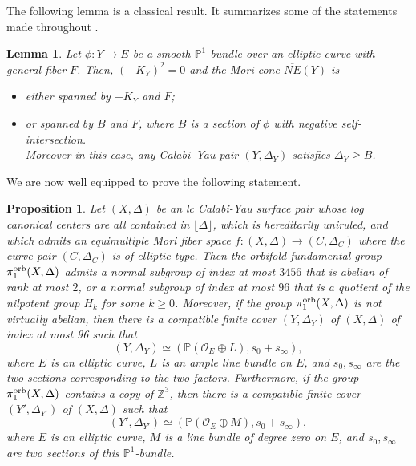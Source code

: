 \documentclass{amsart}
\newcommand{\pp}{\mathbb{P}}
\newcommand{\zz}{\mathbb{Z}}
\newtheorem{lemma}[theorem]{Lemma}
\newtheorem{proposition}[theorem]{Proposition}
\theoremstyle{definition}
\theoremstyle{remark}
\numberwithin{equation}{section}
\begin{document}
The following lemma is a classical result. It summarizes some of the statements made throughout \cite[Part V.2]{Har77}.

\begin{lemma}\label{lem:p1bdle-antican-system}
   Let $\phi: Y\to E$ be a smooth $\pp^1$-bundle over an elliptic curve with general fiber $F$. Then, $(-K_Y)^2 = 0$ and
the Mori cone $\overline{NE}(Y)$ is 
\begin{itemize}
\item either spanned by $-K_Y$ and $F$;
\item  or spanned by $B$ and $F$, where $B$ is a section of $\phi$ with negative self-intersection.\\ Moreover in this case, any Calabi--Yau pair $(Y,\Delta_Y)$ satisfies $\Delta_Y\ge B$.
\end{itemize}
\end{lemma}

We are now well equipped to prove the following statement.

\begin{proposition}\label{prop:ellipticbase}
Let $(X,\Delta)$ be an lc Calabi-Yau surface pair whose log canonical centers are all contained in $\lfloor\Delta\rfloor$, which is hereditarily uniruled, and which admits an equimultiple Mori fiber space $f:(X,\Delta)\to (C,\Delta_C)$ where the curve pair $(C,\Delta_C)$ is of elliptic type.
Then the orbifold fundamental group $\pi_1^{\rm orb}(X,\Delta)$ admits a normal subgroup of index at most $3456$ that is abelian of rank at most $2$, or a normal subgroup of index at most $96$ that is a quotient of the nilpotent group $H_k$ for some $k\ge 0$. 
Moreover, if the group $\pi_1^{\rm orb}(X,\Delta)$ is not virtually abelian, then there is a compatible finite cover $(Y,\Delta_Y)$ of $(X,\Delta)$ of index at most 96 such that 
$$(Y,\Delta_Y)\simeq(\mathbb{P}(\mathcal{O}_E\oplus L),s_0+s_{\infty}),$$
where $E$ is an elliptic curve, $L$ is an ample line bundle on $E$, and $s_0,s_{\infty}$ are the two sections corresponding to the two factors.
Furthermore, if the group $\pi_1^{\rm orb}(X,\Delta)$ contains a copy of $\zz^3$, then there is a compatible finite cover $(Y',\Delta_{Y'})$ of $(X,\Delta)$ such that 
$$(Y',\Delta_{Y'})\simeq(\mathbb{P}(\mathcal{O}_E\oplus M),s_0+s_{\infty}),$$
where $E$ is an elliptic curve, $M$ is a line bundle of degree zero on $E$, and $s_0,s_{\infty}$ are two sections of this $\pp^1$-bundle.
\end{proposition}
\end{document}
